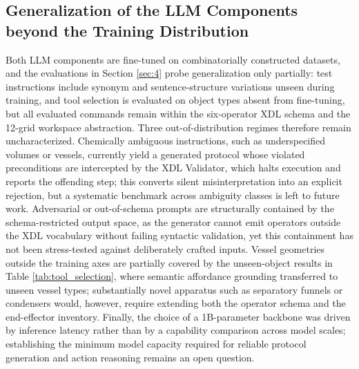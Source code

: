 \documentclass{ieeeaccess}
\begin{document}
\subsection{Generalization of the LLM Components beyond the Training Distribution}\label{sec:5.3}
Both LLM components are fine-tuned on combinatorially constructed datasets, and the evaluations in Section \ref{sec:4} probe generalization only partially: test instructions include synonym and sentence-structure variations unseen during training, and tool selection is evaluated on object types absent from fine-tuning, but all evaluated commands remain within the six-operator XDL schema and the 12-grid workspace abstraction. Three out-of-distribution regimes therefore remain uncharacterized. Chemically ambiguous instructions, such as underspecified volumes or vessels, currently yield a generated protocol whose violated preconditions are intercepted by the XDL Validator, which halts execution and reports the offending step; this converts silent misinterpretation into an explicit rejection, but a systematic benchmark across ambiguity classes is left to future work. Adversarial or out-of-schema prompts are structurally contained by the schema-restricted output space, as the generator cannot emit operators outside the XDL vocabulary without failing syntactic validation, yet this containment has not been stress-tested against deliberately crafted inputs. Vessel geometries outside the training axes are partially covered by the unseen-object results in Table \ref{tab:tool_selection}, where semantic affordance grounding transferred to unseen vessel types; substantially novel apparatus such as separatory funnels or condensers would, however, require extending both the operator schema and the end-effector inventory. Finally, the choice of a 1B-parameter backbone was driven by inference latency rather than by a capability comparison across model scales; establishing the minimum model capacity required for reliable protocol generation and action reasoning remains an open question.
\end{document}
